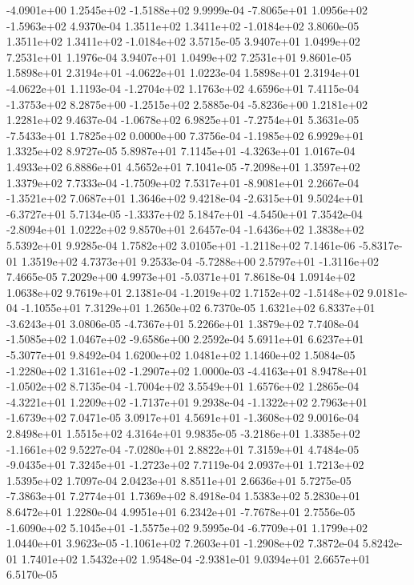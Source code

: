 -4.0901e+00  1.2545e+02 -1.5188e+02  9.9999e-04
-7.8065e+01  1.0956e+02 -1.5963e+02  4.9370e-04
 1.3511e+02  1.3411e+02 -1.0184e+02  3.8060e-05
 1.3511e+02  1.3411e+02 -1.0184e+02  3.5715e-05
3.9407e+01 1.0499e+02 7.2531e+01  1.1976e-04
3.9407e+01 1.0499e+02 7.2531e+01  9.8601e-05
 1.5898e+01  2.3194e+01 -4.0622e+01  1.0223e-04
 1.5898e+01  2.3194e+01 -4.0622e+01  1.1193e-04
-1.2704e+02  1.1763e+02  4.6596e+01  7.4115e-04
-1.3753e+02  8.2875e+00 -1.2515e+02  2.5885e-04
-5.8236e+00  1.2181e+02  1.2281e+02  9.4637e-04
-1.0678e+02  6.9825e+01 -7.2754e+01  5.3631e-05
-7.5433e+01  1.7825e+02  0.0000e+00  7.3756e-04
-1.1985e+02  6.9929e+01  1.3325e+02  8.9727e-05
 5.8987e+01  7.1145e+01 -4.3263e+01  1.0167e-04
1.4933e+02 6.8886e+01 4.5652e+01  7.1041e-05
-7.2098e+01  1.3597e+02  1.3379e+02  7.7333e-04
-1.7509e+02  7.5317e+01 -8.9081e+01  2.2667e-04
-1.3521e+02  7.0687e+01  1.3646e+02  9.4218e-04
-2.6315e+01  9.5024e+01 -6.3727e+01  5.7134e-05
-1.3337e+02  5.1847e+01 -4.5450e+01  7.3542e-04
-2.8094e+01  1.0222e+02  9.8570e+01  2.6457e-04
-1.6436e+02  1.3838e+02  5.5392e+01  9.9285e-04
 1.7582e+02  3.0105e+01 -1.2118e+02  7.1461e-06
-5.8317e-01  1.3519e+02  4.7373e+01  9.2533e-04
-5.7288e+00  2.5797e+01 -1.3116e+02  7.4665e-05
 7.2029e+00  4.9973e+01 -5.0371e+01  7.8618e-04
1.0914e+02 1.0638e+02 9.7619e+01  2.1381e-04
-1.2019e+02  1.7152e+02 -1.5148e+02  9.0181e-04
-1.1055e+01  7.3129e+01  1.2650e+02  6.7370e-05
 1.6321e+02  6.8337e+01 -3.6243e+01  3.0806e-05
-4.7367e+01  5.2266e+01  1.3879e+02  7.7408e-04
-1.5085e+02  1.0467e+02 -9.6586e+00  2.2592e-04
 5.6911e+01  6.6237e+01 -5.3077e+01  9.8492e-04
1.6200e+02 1.0481e+02 1.1460e+02  1.5084e-05
-1.2280e+02  1.3161e+02 -1.2907e+02  1.0000e-03
-4.4163e+01  8.9478e+01 -1.0502e+02  8.7135e-04
-1.7004e+02  3.5549e+01  1.6576e+02  1.2865e-04
-4.3221e+01  1.2209e+02 -1.7137e+01  9.2938e-04
-1.1322e+02  2.7963e+01 -1.6739e+02  7.0471e-05
 3.0917e+01  4.5691e+01 -1.3608e+02  9.0016e-04
2.8498e+01 1.5515e+02 4.3164e+01  9.9835e-05
-3.2186e+01  1.3385e+02 -1.1661e+02  9.5227e-04
-7.0280e+01  2.8822e+01  7.3159e+01  4.7484e-05
-9.0435e+01  7.3245e+01 -1.2723e+02  7.7119e-04
2.0937e+01 1.7213e+02 1.5395e+02  1.7097e-04
2.0423e+01 8.8511e+01 2.6636e+01  5.7275e-05
-7.3863e+01  7.2774e+01  1.7369e+02  8.4918e-04
1.5383e+02 5.2830e+01 8.6472e+01  1.2280e-04
 4.9951e+01  6.2342e+01 -7.7678e+01  2.7556e-05
-1.6090e+02  5.1045e+01 -1.5575e+02  9.5995e-04
-6.7709e+01  1.1799e+02  1.0440e+01  3.9623e-05
-1.1061e+02  7.2603e+01 -1.2908e+02  7.3872e-04
5.8242e-01 1.7401e+02 1.5432e+02  1.9548e-04
-2.9381e-01  9.0394e+01  2.6657e+01  6.5170e-05
